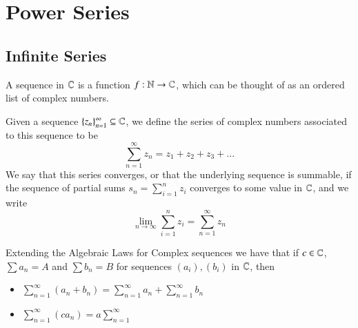 %
%
%
\chapter{Power Series}
\label{PowSer} %


\section{Infinite Series}


\begin{definition}
    A sequence in $\mathbb C$ is a function $f:\mathbb N\rightarrow \mathbb C$, which can be thought of as an ordered list of complex numbers.
\end{definition}

\begin{definition}
    Given a sequence $\{z_n\}_{n=1}^{\infty}\subseteq \mathbb C$, we define the series of complex numbers associated to this sequence to be \begin{equation*}
        \sum_{n=1}^{\infty}z_n = z_1+z_2+z_3+...
    \end{equation*}
    We say that this series converges, or that the underlying sequence is summable, if the sequence of partial sums $s_n = \sum_{i=1}^nz_i$ converges to some value in $\mathbb C$, and we write \begin{equation*}
        \lim\limits_{n\rightarrow \infty}\sum_{i=1}^nz_i = \sum_{n=1}^{\infty}z_n
    \end{equation*}
\end{definition}

\begin{proposition}
    Extending the Algebraic Laws for Complex sequences we have that if $c \in \mathbb C$, $\sum a_n = A$ and $\sum b_n = B$ for sequences $(a_i),(b_i)$ in $\mathbb C$, then \begin{itemize}
        \item $\sum_{n=1}^{\infty}(a_n+b_n) = \sum_{n=1}^{\infty}a_n+\sum_{n=1}^{\infty}b_n$
        \item $\sum_{n=1}^{\infty}(ca_n) = a\sum_{n=1}^{\infty}$
    \end{itemize}
\end{proposition}


